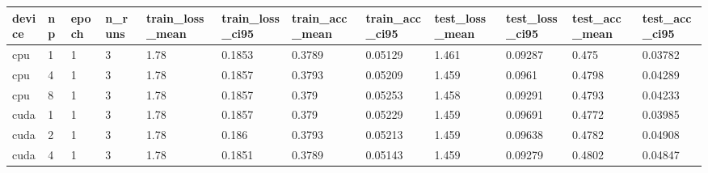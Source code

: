 \begin{tabular}{llllllllllll}
\hline
device & np & epoch & n\_runs & train\_loss\_mean & train\_loss\_ci95 & train\_acc\_mean & train\_acc\_ci95 & test\_loss\_mean & test\_loss\_ci95 & test\_acc\_mean & test\_acc\_ci95 \\
\hline
cpu & 1 & 1 & 3 & 1.78 & 0.1853 & 0.3789 & 0.05129 & 1.461 & 0.09287 & 0.475 & 0.03782 \\
cpu & 4 & 1 & 3 & 1.78 & 0.1857 & 0.3793 & 0.05209 & 1.459 & 0.0961 & 0.4798 & 0.04289 \\
cpu & 8 & 1 & 3 & 1.78 & 0.1857 & 0.379 & 0.05253 & 1.458 & 0.09291 & 0.4793 & 0.04233 \\
cuda & 1 & 1 & 3 & 1.78 & 0.1857 & 0.379 & 0.05229 & 1.459 & 0.09691 & 0.4772 & 0.03985 \\
cuda & 2 & 1 & 3 & 1.78 & 0.186 & 0.3793 & 0.05213 & 1.459 & 0.09638 & 0.4782 & 0.04908 \\
cuda & 4 & 1 & 3 & 1.78 & 0.1851 & 0.3789 & 0.05143 & 1.459 & 0.09279 & 0.4802 & 0.04847 \\
\hline
\end{tabular}
